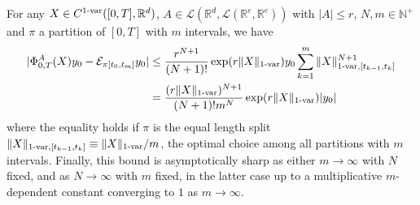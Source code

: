 \documentclass{article}
\newcommand{\var}[1]{{#1 \mathchar"2D \mathrm{var}}}
\numberwithin{equation}{section}
\theoremstyle{definition}
\theoremstyle{remark}
\begin{document}
\begin{theorem}\label{thm:euler1}
For any $X \in C^{\var{1}}([0,T], \mathbb R^d)$, $A \in \mathcal L(\mathbb R^d, \mathcal L(\mathbb R^e, \mathbb R^e))$ with $|A| \leq r$, $N, m \in \mathbb N^+$ and $\pi$ a partition of $[0,T]$ with $m$ intervals, we have
\begin{align*}
|\Phi_{0,T}^A(X)y_0 - \mathcal E_{\pi[t_0,t_m]} y_0| &\leq \frac{r^{N+1}}{(N+1)!} \exp(r \| X \|_{\var{1}}) y_0 \sum_{k = 1}^m \| X \|_{\var{1},[t_{k - 1}, t_k]}^{N+1} \\
&= \frac{(r\| X \|_{\var{1}})^{N+1}}{(N+1)! m^N} \exp(r \| X \|_{\var{1}}) |y_0|
\end{align*}
where the equality holds if $\pi$ is the equal length split $\| X \|_{\var{1}, [t_{k-1}, t_k]} \equiv \| X \|_{\var{1}}/m$, the optimal choice among all partitions with $m$ intervals. Finally, this bound is asymptotically sharp as either $m \to \infty$ with $N$ fixed, and as $N \to \infty$ with $m$ fixed, in the latter case up to a multiplicative $m$-dependent constant converging to $1$ as $m \to \infty$.
\end{theorem}
\end{document}
